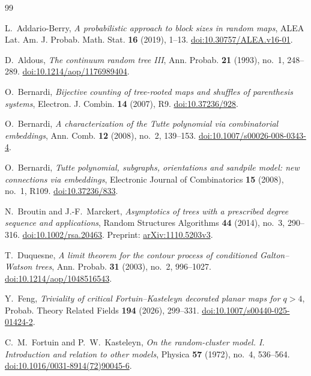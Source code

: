 \begin{thebibliography}{99}

L.~Addario-Berry,
\emph{A probabilistic approach to block sizes in random maps},
ALEA Lat. Am. J. Probab. Math. Stat. \textbf{16} (2019), 1--13.
\href{https://doi.org/10.30757/ALEA.v16-01}{doi:10.30757/ALEA.v16-01}.

D.~Aldous,
\emph{The continuum random tree III},
Ann. Probab. \textbf{21} (1993), no.~1, 248--289.
\href{https://doi.org/10.1214/aop/1176989404}{doi:10.1214/aop/1176989404}.

O.~Bernardi,
\emph{Bijective counting of tree-rooted maps and shuffles of parenthesis systems},
Electron. J. Combin. \textbf{14} (2007), R9.
\href{https://doi.org/10.37236/928}{doi:10.37236/928}.

O.~Bernardi,
\emph{A characterization of the Tutte polynomial via combinatorial embeddings},
Ann. Comb. \textbf{12} (2008), no.~2, 139--153.
\href{https://doi.org/10.1007/s00026-008-0343-4}{doi:10.1007/s00026-008-0343-4}.

O.~Bernardi,
\emph{Tutte polynomial, subgraphs, orientations and sandpile model: new connections via embeddings},
Electronic Journal of Combinatorics \textbf{15} (2008), no.~1, R109.
\href{https://doi.org/10.37236/833}{doi:10.37236/833}.

N.~Broutin and J.-F.~Marckert,
\emph{Asymptotics of trees with a prescribed degree sequence and applications},
Random Structures Algorithms \textbf{44} (2014), no.~3, 290--316.
\href{https://doi.org/10.1002/rsa.20463}{doi:10.1002/rsa.20463}.
Preprint: \href{https://arxiv.org/abs/1110.5203v3}{arXiv:1110.5203v3}.

T.~Duquesne,
\emph{A limit theorem for the contour process of conditioned Galton--Watson trees},
Ann. Probab. \textbf{31} (2003), no.~2, 996--1027.
\href{https://doi.org/10.1214/aop/1048516543}{doi:10.1214/aop/1048516543}.

Y.~Feng,
\emph{Triviality of critical Fortuin--Kasteleyn decorated planar maps for $q>4$},
Probab. Theory Related Fields \textbf{194} (2026), 299--331.
\href{https://doi.org/10.1007/s00440-025-01424-2}{doi:10.1007/s00440-025-01424-2}.

C.~M.~Fortuin and P.~W.~Kasteleyn,
\emph{On the random-cluster model. I. Introduction and relation to other models},
Physica \textbf{57} (1972), no.~4, 536--564.
\href{https://doi.org/10.1016/0031-8914(72)90045-6}{doi:10.1016/0031-8914(72)90045-6}.


\end{thebibliography}
